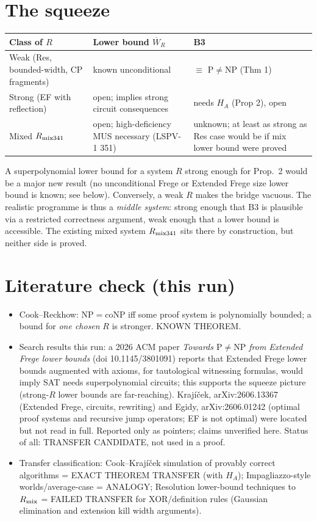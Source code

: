 \documentclass[11pt]{article}
\begin{document}
\section*{The squeeze}
\begin{center}
\begin{tabular}{p{4.2cm}p{4.2cm}p{5.2cm}}
\textbf{Class of $R$}&\textbf{Lower bound $\overline W_R$}&\textbf{B3}\\\hline
Weak (Res, bounded-width, CP fragments) & known unconditional & $\equiv$ P$\ne$NP (Thm 1)\\
Strong (EF with reflection) & open; implies strong circuit consequences & needs $H_A$ (Prop 2), open\\
Mixed $R_{\rm mix341}$ & open; high-deficiency MUS necessary (LSPV-1 351) & unknown; at least as strong as Res case would be if mix lower bound were proved
\end{tabular}
\end{center}
A superpolynomial lower bound for a system $R$ strong enough for Prop.~2 would be a major new result (no unconditional Frege or Extended Frege size lower bound is known; see below). Conversely, a weak $R$ makes the bridge vacuous. The realistic programme is thus a \emph{middle system}: strong enough that B3 is plausible via a restricted correctness argument, weak enough that a lower bound is accessible. The existing mixed system $R_{\rm mix341}$ sits there by construction, but neither side is proved.

\section*{Literature check (this run)}
\begin{itemize}
\item Cook--Reckhow: $\mathrm{NP}=\mathrm{coNP}$ iff some proof system is polynomially bounded; a bound for \emph{one chosen} $R$ is stronger. KNOWN THEOREM.
\item Search results this run: a 2026 ACM paper \emph{Towards $\mathrm P\ne\mathrm{NP}$ from Extended Frege lower bounds} (doi 10.1145/3801091) reports that Extended Frege lower bounds augmented with axioms, for tautological witnessing formulas, would imply SAT needs superpolynomial circuits; this supports the squeeze picture (strong-$R$ lower bounds are far-reaching). Krajíček, arXiv:2606.13367 (Extended Frege, circuits, rewriting) and Egidy, arXiv:2606.01242 (optimal proof systems and recursive jump operators; EF is not optimal) were located but not read in full. Reported only as pointers; claims unverified here. Status of all: TRANSFER CANDIDATE, not used in a proof.
\item Transfer classification: Cook--Krajíček simulation of provably correct algorithms = EXACT THEOREM TRANSFER (with $H_A$); Impagliazzo-style worlds/average-case = ANALOGY; Resolution lower-bound techniques to $R_{\rm mix}$ = FAILED TRANSFER for XOR/definition rules (Gaussian elimination and extension kill width arguments).
\end{itemize}
\end{document}
